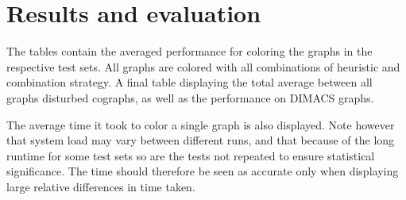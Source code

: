 \documentclass[a4paper]{article}
\begin{document}
\section{Results and evaluation}
\label{sec:Result}
The tables contain the averaged performance for coloring the graphs in the
respective test sets. All graphs are colored with all combinations of heuristic
and combination strategy. A final table displaying the total average between all
graphs disturbed cographs, as well as the performance on DIMACS graphs.

The average time it took to color a single graph is also displayed. Note
however that system load may vary between different runs, and that because of
the long runtime for some test sets so are the tests not repeated to ensure
statistical significance. The time should therefore be seen as accurate only
when displaying large relative differences in time taken.

\end{document}
